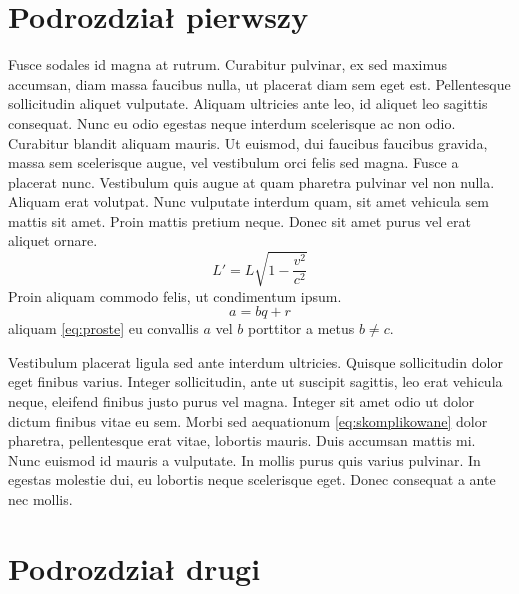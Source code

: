 \documentclass[polish,engineering]{wizthesis}
\begin{document}
\section{Podrozdział pierwszy}

Fusce sodales id magna at rutrum. Curabitur pulvinar, ex sed maximus accumsan, diam massa faucibus nulla, ut placerat diam sem eget est. Pellentesque sollicitudin aliquet vulputate. Aliquam ultricies ante leo, id aliquet leo sagittis consequat. Nunc eu odio egestas neque interdum scelerisque ac non odio. Curabitur blandit aliquam mauris.
Ut euismod, dui faucibus faucibus gravida, massa sem scelerisque augue, vel vestibulum orci felis sed magna. Fusce a placerat nunc. Vestibulum quis augue at quam pharetra pulvinar vel non nulla. Aliquam erat volutpat. Nunc vulputate interdum quam, sit amet vehicula sem mattis sit amet. Proin mattis pretium neque. Donec sit amet purus vel erat aliquet \cite{einstein} ornare.
\begin{equation} \label{eq:skomplikowane}
  L' = {L}{\sqrt{1-\frac{v^2}{c^2}}}
\end{equation}
Proin aliquam commodo felis, ut condimentum ipsum.
\begin{equation} \label{eq:proste}
  a = bq + r
\end{equation}
aliquam \eqref{eq:proste} eu convallis $a$ vel $b$ porttitor a metus $b \neq c$.

Vestibulum placerat ligula sed ante interdum ultricies. Quisque sollicitudin dolor eget finibus varius. Integer sollicitudin, ante ut suscipit sagittis, leo erat vehicula neque, eleifend finibus justo purus vel magna. Integer sit amet odio ut dolor dictum finibus vitae eu sem. Morbi sed aequationum \eqref{eq:skomplikowane} dolor pharetra, pellentesque erat vitae, lobortis mauris. Duis accumsan mattis mi. Nunc euismod id mauris a vulputate. In mollis purus quis varius pulvinar. In egestas molestie dui, eu lobortis neque scelerisque eget. Donec consequat a ante nec mollis.

\section{Podrozdział drugi}
\end{document}
